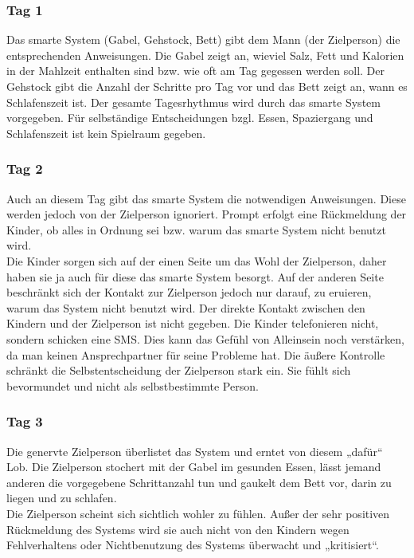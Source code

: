 \subsubsection{\textbf{Tag 1}}
Das smarte System (Gabel, Gehstock, Bett) gibt dem Mann (der Zielperson) die entsprechenden Anweisungen. Die Gabel zeigt an, wieviel Salz, Fett und Kalorien in der Mahlzeit enthalten sind bzw. wie oft am Tag gegessen werden soll. Der Gehstock gibt die Anzahl der Schritte pro Tag vor und das Bett zeigt an, wann es Schlafenszeit ist. Der gesamte Tagesrhythmus wird durch das smarte System vorgegeben. Für selbständige Entscheidungen bzgl. Essen, Spaziergang und Schlafenszeit ist kein Spielraum gegeben.
\subsubsection{\textbf{Tag 2}}
Auch an diesem Tag gibt das smarte System die notwendigen Anweisungen. Diese werden jedoch von der Zielperson ignoriert. Prompt erfolgt eine Rückmeldung der Kinder, ob alles in Ordnung sei bzw. warum das smarte System nicht benutzt wird. \\
Die Kinder sorgen sich auf der einen Seite um das Wohl der Zielperson, daher haben sie ja auch für diese das smarte System besorgt. Auf der anderen Seite beschränkt sich der Kontakt zur Zielperson jedoch nur darauf, zu eruieren, warum das System nicht benutzt wird. Der direkte Kontakt zwischen den Kindern und der Zielperson ist nicht gegeben. Die Kinder telefonieren nicht, sondern schicken eine SMS. Dies kann das Gefühl von Alleinsein noch verstärken, da man keinen Ansprechpartner für seine Probleme hat. Die äußere Kontrolle schränkt die Selbstentscheidung der Zielperson stark ein. Sie fühlt sich bevormundet und nicht als selbstbestimmte Person.
\subsubsection{\textbf{Tag 3}}
Die genervte Zielperson überlistet das System und erntet von diesem „dafür“ Lob. Die Zielperson stochert mit der Gabel im gesunden Essen, lässt jemand anderen die vorgegebene Schrittanzahl tun und gaukelt dem Bett vor, darin zu liegen und zu schlafen. \\
Die Zielperson scheint sich sichtlich wohler zu fühlen. Außer der sehr positiven Rückmeldung des Systems wird sie auch nicht von den Kindern wegen Fehlverhaltens oder Nichtbenutzung des Systems überwacht und „kritisiert“. 

